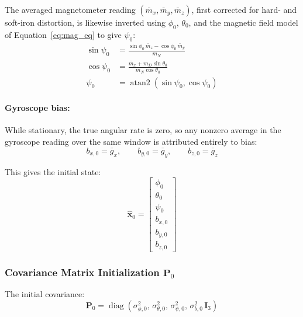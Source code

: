 \documentclass[12pt,a4paper]{article}
\newcommand{\bx}{\bm{x}}
\newcommand{\bP}{\bm{P}}
\newcommand{\diag}{\operatorname{diag}}
\begin{document}
{The averaged magnetometer reading $(\bar{m}_x, \bar{m}_y, \bar{m}_z)$,
first corrected for hard- and soft-iron distortion, is likewise
inverted using $\phi_0$, $\theta_0$, and the magnetic field model of
Equation~\eqref{eq:mag_eq} to give $\psi_0$:
\begin{align}
\label{eq:psi0}
  \sin\psi_0 &= \frac{\sin\phi_0\, \bar{m}_z - \cos\phi_0\, \bar{m}_y}{m_N} \\
  \cos\psi_0 &= \frac{\bar{m}_x + m_D \sin\theta_0}{m_N \cos\theta_0} \\
  \psi_0 &= \operatorname{atan2}(\sin\psi_0, \cos\psi_0)
\end{align}

\paragraph{Gyroscope bias:} While stationary, the true angular rate is
zero, so any nonzero average in the gyroscope reading over the same
window is attributed entirely to bias:
\begin{equation}
  b_{x,0} = \bar{g}_x, \qquad b_{y,0} = \bar{g}_y, \qquad b_{z,0} = \bar{g}_z
\end{equation}

This gives the initial state:
\begin{equation}
  \hat{\bx}_0 =
  \begin{bmatrix}
    \phi_0 \\ \theta_0 \\ \psi_0 \\ b_{x,0} \\ b_{y,0} \\ b_{z,0}
  \end{bmatrix}
\end{equation}

\subsubsection{Covariance Matrix Initialization \texorpdfstring{$\bm{P}_0$}{P0}}
\label{sec:P0_init}

The initial covariance:
\begin{equation}
  \bP_0 = \diag\!\left(\sigma_{\phi,0}^2,\, \sigma_{\theta,0}^2,\,
                        \sigma_{\psi,0}^2,\, \sigma_{b,0}^2\,\bm{I}_3\right)
\end{equation}

}
\end{document}
